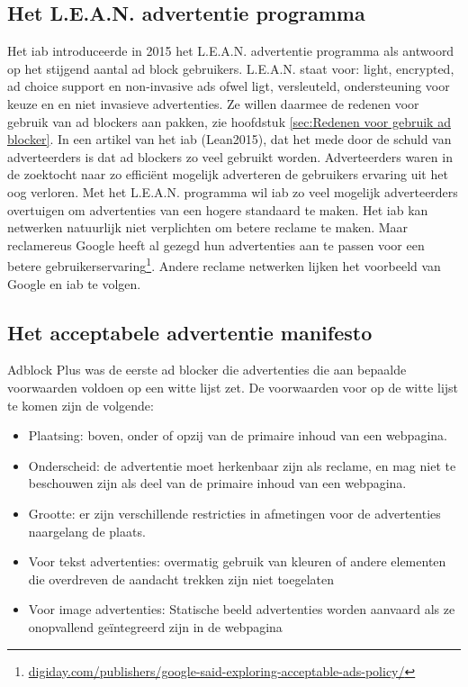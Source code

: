 \documentclass[pdftex,a4paper,12pt,twoside]{report}
\begin{document}
\subsection{Het L.E.A.N. advertentie programma}
\label{sec Het L.E.A.N. advertentie programma}
 Het iab introduceerde in 2015 het L.E.A.N. advertentie programma als antwoord op het stijgend aantal ad block gebruikers. L.E.A.N. staat voor: light, encrypted, ad choice support en non-invasive ads ofwel ligt, versleuteld, ondersteuning voor keuze en en niet invasieve advertenties. Ze willen daarmee de redenen voor gebruik van ad blockers aan pakken, zie hoofdstuk \ref{sec:Redenen voor gebruik ad blocker}. In een artikel van het iab (Lean2015), dat het mede door de schuld van adverteerders is dat ad blockers zo veel gebruikt worden. Adverteerders waren in de zoektocht naar zo efficiënt mogelijk adverteren de gebruikers ervaring uit het oog verloren. Met het L.E.A.N. programma wil iab zo veel mogelijk adverteerders overtuigen om advertenties van een hogere standaard te maken. Het iab kan netwerken natuurlijk niet verplichten om betere reclame te maken. Maar reclamereus Google heeft al gezegd hun advertenties aan te passen voor een betere gebruikerservaring\footnote{\url{digiday.com/publishers/google-said-exploring-acceptable-ads-policy/}}. Andere reclame netwerken lijken het voorbeeld van Google en iab te volgen.

\subsection{Het acceptabele advertentie manifesto}
\label{sec Het acceptabele advertentie manifesto}
Adblock Plus was de eerste ad blocker die advertenties die aan bepaalde voorwaarden voldoen op een witte lijst zet. De voorwaarden voor op de witte lijst te komen zijn de volgende:

\begin{itemize}
	\item Plaatsing: boven, onder of opzij van de primaire inhoud van een webpagina.
	\item Onderscheid: de advertentie moet herkenbaar zijn als reclame, en mag niet te beschouwen zijn als deel van de primaire inhoud van een webpagina.
	\item Grootte: er zijn verschillende restricties in afmetingen voor de advertenties naargelang de plaats.
	\item Voor tekst advertenties: overmatig gebruik van kleuren of andere elementen die overdreven de aandacht trekken zijn niet toegelaten
	\item Voor image advertenties: Statische beeld advertenties worden aanvaard als ze onopvallend geïntegreerd zijn in de webpagina
\end{itemize}
\end{document}

